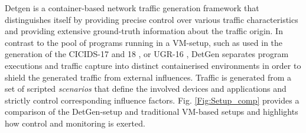 \documentclass[runningheads]{llncs}
\begin{document}
Detgen is a container-based network traffic generation framework that distinguishes itself by providing precise control over various traffic characteristics and providing extensive ground-truth information about the traffic origin. %
In contrast to the pool of programs running in a VM-setup, such as used in the generation of the CICIDS-17 and 18 \cite{sharafaldin2018toward}, or UGR-16 \cite{macia2018ugr}, DetGen separates program executions and traffic capture into distinct containerised environments in order to shield the generated traffic from external influences.%
Traffic is generated from a set of scripted \textit{scenarios} that define the involved devices and applications and strictly control corresponding influence factors. 
Fig. \ref{Fig:Setup_comp} provides a comparison of the DetGen-setup and traditional VM-based setups and highlights how control and monitoring is exerted.
\end{document}
